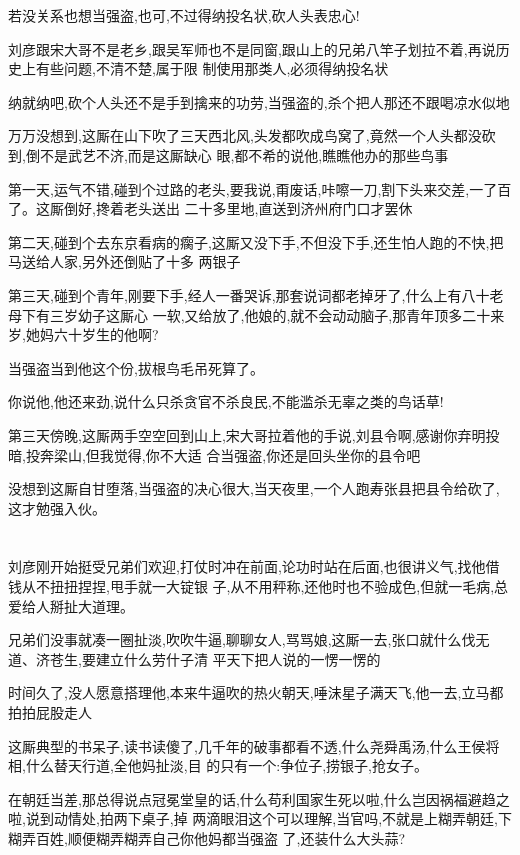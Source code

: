 ﻿\documentclass[12pt]{article}
\begin{document}
若没关系也想当强盗,也可,不过得纳投名状,砍人头表忠心!

刘彦跟宋大哥不是老乡,跟吴军师也不是同窗,跟山上的兄弟八竿子划拉不着,再说历史上有些问题,不清不楚,属于限
制使用那类人,必须得纳投名状

纳就纳吧,砍个人头还不是手到擒来的功劳,当强盗的,杀个把人那还不跟喝凉水似地

万万没想到,这厮在山下吹了三天西北风,头发都吹成鸟窝了,竟然一个人头都没砍到,倒不是武艺不济,而是这厮缺心
眼,都不希的说他,瞧瞧他办的那些鸟事

第一天,运气不错,碰到个过路的老头,要我说,甭废话,咔嚓一刀,割下头来交差,一了百了。这厮倒好,搀着老头送出
二十多里地,直送到济州府门口才罢休

第二天,碰到个去东京看病的瘸子,这厮又没下手,不但没下手,还生怕人跑的不快,把马送给人家,另外还倒贴了十多
两银子

第三天,碰到个青年,刚要下手,经人一番哭诉,那套说词都老掉牙了,什么上有八十老母下有三岁幼子\dldots 这厮心
一软,又给放了,他娘的,就不会动动脑子,那青年顶多二十来岁,她妈六十岁生的他啊?

当强盗当到他这个份,拔根鸟毛吊死算了。

你说他,他还来劲,说什么只杀贪官不杀良民,不能滥杀无辜之类的鸟话\dldots 草!

第三天傍晚,这厮两手空空回到山上,宋大哥拉着他的手说,刘县令啊,感谢你弃明投暗,投奔梁山,但我觉得,你不大适
合当强盗,你还是回头坐你的县令吧\dldots

没想到这厮自甘堕落,当强盗的决心很大,当天夜里,一个人跑寿张县把县令给砍了,这才勉强入伙。

\section{}

刘彦刚开始挺受兄弟们欢迎,打仗时冲在前面,论功时站在后面,也很讲义气,找他借钱从不扭扭捏捏,甩手就一大锭银
子,从不用秤称,还他时也不验成色,但就一毛病,总爱给人掰扯大道理。

兄弟们没事就凑一圈扯淡,吹吹牛逼,聊聊女人,骂骂娘,这厮一去,张口就什么伐无道、济苍生,要建立什么劳什子清
平天下\dldots 把人说的一愣一愣的\dldots

时间久了,没人愿意搭理他,本来牛逼吹的热火朝天,唾沫星子满天飞,他一去,立马都拍拍屁股走人

这厮典型的书呆子,读书读傻了,几千年的破事都看不透,什么尧舜禹汤,什么王侯将相,什么替天行道,全他妈扯淡,目
的只有一个:争位子,捞银子,抢女子。

在朝廷当差,那总得说点冠冕堂皇的话,什么苟利国家生死以啦,什么岂因祸福避趋之啦,说到动情处,拍两下桌子,掉
两滴眼泪\dldots 这个可以理解,当官吗,不就是上糊弄朝廷,下糊弄百姓,顺便糊弄糊弄自己\dldots 你他妈都当强盗
了,还装什么大头蒜?
\end{document}
